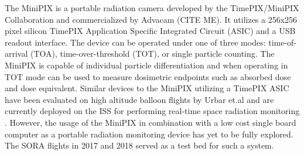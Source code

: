 The MiniPIX is a portable radiation camera developed by the TimePIX/MiniPIX Collaboration and commercialized by Advacam (CITE ME).  %
%
It utilizes a 256x256 pixel silicon TimePIX Application Specific Integrated Circuit (ASIC) and a USB readout interface. The device can be operated under one of three modes: time-of-arrival (TOA), time-over-threshold (TOT), or single particle counting. The MiniPIX is capable of individual particle differentiation and when operating in TOT mode can be used to measure dosimetric endpoints such as absorbed dose and dose equivalent. Similar devices to the MiniPIX utilizing a TimePIX ASIC have been evaluated on high altitude balloon flights by Urbar et.al \cite{bexus} and are currently deployed on the ISS for performing real-time space radiation monitoring \cite{timepixiss}. However, the usage of the MiniPIX in combination with a low cost single board computer as a portable radiation monitoring device has yet to be fully explored. The SORA flights in 2017 and 2018 served as a test bed for such a system.


%
%

